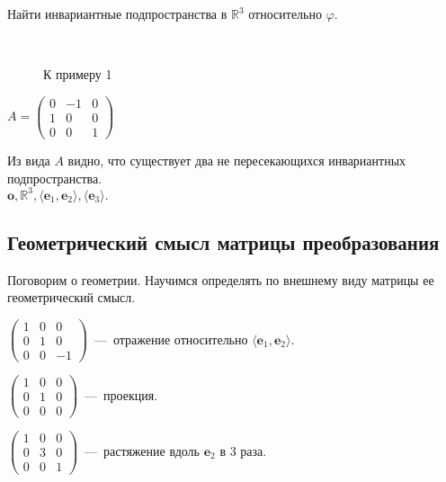 \begin{prim} %
Найти инвариантные подпространства в $\mathbb{R}^3$ относительно $\varphi$. %
\end{prim}\\

\begin{wrapfigure}{r}{0.27\linewidth}
	\def\svgwidth{3cm} %
	
	\caption{К примеру 1}
	\label{prim1}
	\vspace{-1cm}
\end{wrapfigure}

$A = \left( \begin{array}{rr|r} %
0&-1&0\\
1&0&0\\ 
\hline
0&0&1
\end{array} \right)$

Из вида $A$ видно, что существует два не пересекающихся инвариантных подпространства.\\
$\textbf{o}, \mathbb{R}^3, \langle \textbf{e$_1$}, \textbf{e$_2$} \rangle, \langle \textbf{e$_3$} \rangle.$\\ %

\subsection{Геометрический смысл матрицы преобразования}
Поговорим о геометрии. Научимся определять по внешнему виду матрицы ее геометрический смысл.
 
$\left( \begin{array}{rrr}
    1 & 0 & 0  \\
    0 & 1& 0\\
    0&0&-1
\end{array}\right)$~---~отражение относительно $\langle \textbf{e$_1$}, \textbf{e$_2$} \rangle.$ %

$\left( \begin{array}{rrr}
    1 & 0 & 0  \\
    0 & 1& 0\\
    0&0&0
\end{array}\right)$~---~проекция.

$\left( \begin{array}{rrr}
    1 & 0 & 0  \\
    0 & 3& 0\\
    0&0&1
\end{array}\right)$~---~растяжение вдоль $\textbf{e$_2$}$ в 3 раза.\\

